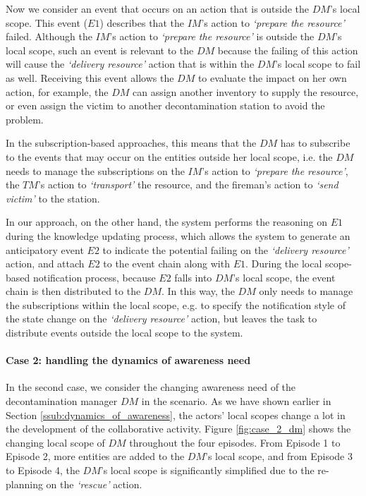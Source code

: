 Now we consider an event that occurs on an action that is outside the $DM$'s local scope. This event ($E1$) describes that the $IM$'s action to \emph{`prepare the resource'} failed. Although the $IM$'s action to \emph{`prepare the resource'} is outside the $DM$'s local scope, such an event is relevant to the $DM$ because the failing of this action will cause the \emph{`delivery resource'} action that is within the $DM$'s local scope to fail as well. Receiving this event allows the $DM$ to evaluate the impact on her own action, for example, the $DM$ can assign another inventory to supply the resource, or even assign the victim to another decontamination station to avoid the problem. 

In the subscription-based approaches, this means that the $DM$ has to subscribe to the events that may occur on the entities outside her local scope, i.e. the $DM$ needs to manage the subscriptions on the $IM$'s action to \emph{`prepare the resource'}, the $TM$'s action to \emph{`transport'} the resource, and the fireman's action to \emph{`send victim'} to the station.

In our approach, on the other hand, the system performs the reasoning on $E1$ during the knowledge updating process, which allows the system to generate an anticipatory event $E2$ to indicate the potential failing on the \emph{`delivery resource'} action, and attach $E2$ to the event chain along with $E1$. During the local scope-based notification process, because $E2$ falls into $DM$'s local scope, the event chain is then distributed to the $DM$. In this way, the $DM$ only needs to manage the subscriptions within the local scope, e.g. to specify the notification style of the state change on the \emph{`delivery resource'} action, but leaves the task to distribute events outside the local scope to the system.

\paragraph*{Case 2: handling the dynamics of awareness need} %
\label{par:case_2_handling_the_dynamics_of_the_field_of_work}
In the second case, we consider the changing awareness need of the decontamination manager $DM$ in the scenario. As we have shown earlier in Section \ref{ssub:dynamics_of_awareness}, the actors' local scopes change a lot in the development of the collaborative activity. Figure \ref{fig:case_2_dm} shows the changing local scope of $DM$ throughout the four episodes. From Episode 1 to Episode 2, more entities are added to the $DM$'s local scope, and from Episode 3 to Episode 4, the $DM$'s local scope is significantly simplified due to the re-planning on the \emph{`rescue'} action.

